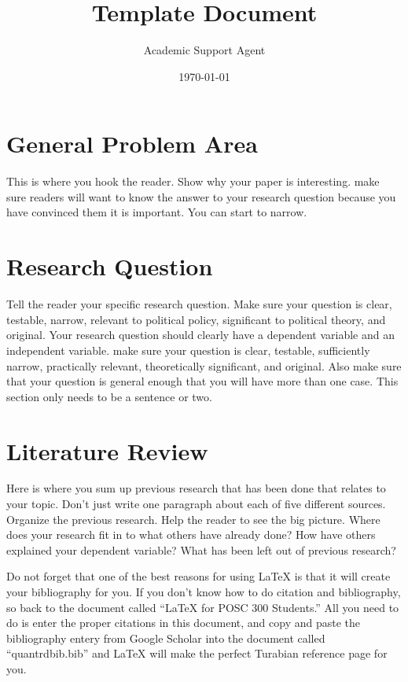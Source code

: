 \documentclass{article}
\title{Template Document}
\author{Academic Support Agent}
\date{\today}
\begin{document}
\maketitle

\maketitle
\section{General Problem Area}
This is where you hook the reader. Show why your paper is interesting. make sure readers will want to know the answer to your research question because you have convinced them it is important. You can start to narrow. 

\section{Research Question}
Tell the reader your specific research question. Make sure your question is clear, testable, narrow, relevant to political policy, significant to political theory, and original. Your research question should clearly have a dependent variable and an independent variable. make sure your question is clear, testable, sufficiently narrow, practically relevant, theoretically significant, and original. Also make sure that your question is general enough that you will have more than one case. This section only needs to be a sentence or two.

\section{Literature Review}
Here is where you sum up previous research that has been done that relates to your topic. Don't just write one paragraph about each of five different sources. Organize the previous research. Help the reader to see the big picture. Where does your research fit in to what others have already done? How have others explained your dependent variable? What has been left out of previous research? 

Do not forget that one of the best reasons for using \LaTeX{} is that it will create your bibliography for you. If you don't know how to do citation and bibliography, so back to the document called ``\LaTeX{} for POSC 300 Students.'' All you need to do is enter the proper citations in this document, and copy and paste the bibliography entery from Google Scholar into the document called ``quantrdbib.bib'' and \LaTeX{} will make the perfect Turabian reference page for you.
\end{document}
